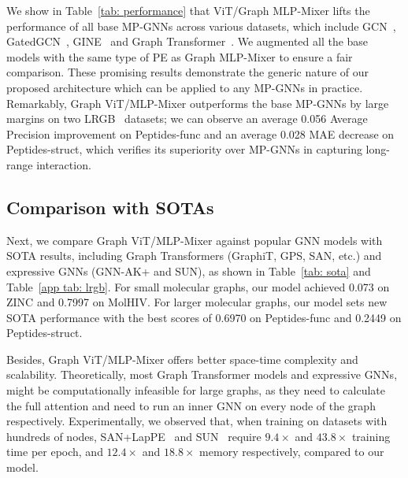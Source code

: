 \documentclass{article}
\begin{document}
We show in Table~\ref{tab: performance} that ViT/Graph MLP-Mixer lifts the performance of all base MP-GNNs across various datasets, which include GCN~\citep{kipf2017semi}, GatedGCN~\citep{bresson2017gatedgcn}, GINE~\citep{hu2019gine} and Graph Transformer~\citep{dwivedi2021generalization}. We augmented all the base models with the same type of PE as Graph MLP-Mixer to ensure a fair comparison. These promising results demonstrate the generic nature of our proposed architecture which can be applied to any MP-GNNs in practice. 
Remarkably, Graph ViT/MLP-Mixer outperforms the base MP-GNNs by large margins on two LRGB~\citep{dwivedi2022long} datasets; we can observe an average 0.056 Average Precision improvement on Peptides-func and an average 0.028 MAE decrease on Peptides-struct, which verifies its superiority over MP-GNNs in capturing long-range interaction.


\subsection{Comparison with SOTAs}

Next, we compare Graph ViT/MLP-Mixer against popular GNN models with SOTA results, including Graph Transformers (GraphiT, GPS, SAN, etc.) and expressive GNNs (GNN-AK+ and SUN),
as shown in Table~\ref{tab: sota} and Table~\ref{app tab: lrgb}. For small molecular graphs, our model achieved 0.073 on ZINC and 0.7997 on MolHIV. For larger molecular graphs, our model sets new SOTA performance with the best scores of 0.6970 on Peptides-func and 0.2449 on Peptides-struct. 


Besides, Graph ViT/MLP-Mixer offers better space-time complexity and scalability. 
Theoretically, most Graph Transformer models and expressive GNNs, might be computationally infeasible for large graphs, as they need to calculate the full attention and need to run an inner GNN on every node of the graph respectively. Experimentally, we observed that, when training on datasets with hundreds of nodes, SAN+LapPE~\citep{chen2022structure_SAT} and SUN~\citep{sun} require $9.4\times$ and $43.8\times$ training time per epoch, and $12.4\times$ and $18.8\times$ memory respectively, compared to our model. 
\end{document}
